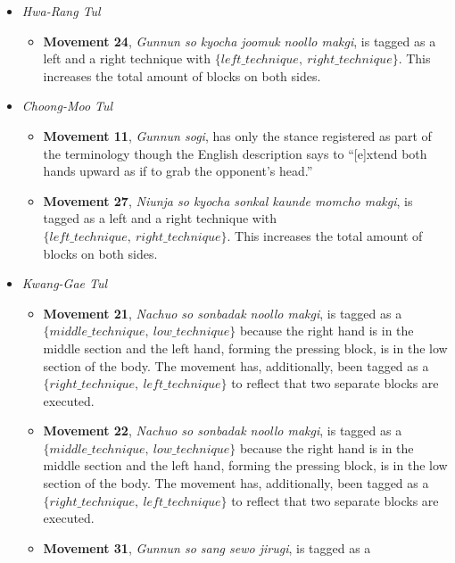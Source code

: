 \documentclass[10pt,twocolumn,a4paper]{article}
\begin{document}
\begin{itemize}
  \item
    \emph{Hwa-Rang Tul}
    \begin{itemize}
      \item
        {\bf Movement 24}, \emph{Gunnun so kyocha joomuk noollo makgi}, is
        tagged as a left and a right technique with $\{left\_technique, \:
        right\_technique\}$. This increases the total amount of blocks on both
        sides.
    \end{itemize}
  \item
    \emph{Choong-Moo Tul}
    \begin{itemize}
      \item
        {\bf Movement 11}, \emph{Gunnun sogi}, has only the stance registered
        as part of the terminology though the English description says to
        ``[e]xtend both hands upward as if to grab the opponent's head.''
      \item
        {\bf Movement 27}, \emph{Niunja so kyocha sonkal kaunde momcho makgi},
        is tagged as a left and a right technique with $\{left\_technique, \:
        right\_technique\}$. This increases the total amount of blocks on both
        sides.
    \end{itemize}
  \item
    \emph{Kwang-Gae Tul}
    \begin{itemize}
      \item
        {\bf Movement 21}, \emph{Nachuo so sonbadak noollo makgi}, is tagged as
        a $\{middle\_technique, \: low\_technique\}$ because the right hand is
        in the middle section and the left hand, forming the pressing block, is
        in the low section of the body. The movement has, additionally, been
        tagged as a $\{right\_technique, \: left\_technique\}$ to reflect that
        two separate blocks are executed.
      \item
        {\bf Movement 22}, \emph{Nachuo so sonbadak noollo makgi}, is tagged as
        a $\{middle\_technique, \: low\_technique\}$ because the right hand is
        in the middle section and the left hand, forming the pressing block, is
        in the low section of the body. The movement has, additionally, been
        tagged as a $\{right\_technique, \: left\_technique\}$ to reflect that
        two separate blocks are executed.
      \item
        {\bf Movement 31}, \emph{Gunnun so sang sewo jirugi}, is tagged as a

\end{itemize}
\end{itemize}
\end{document}
